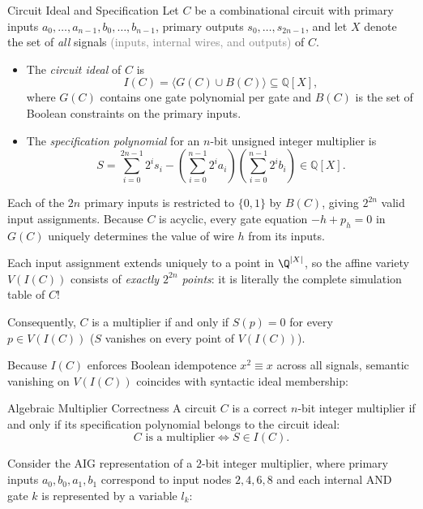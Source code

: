 \documentclass[a4paper, 11pt]{report}
\begin{document}
\begin{defframe}{Circuit Ideal and Specification}{}
Let $C$ be a combinational circuit with primary inputs $a_0,\dots,a_{n-1}, b_0,\dots,b_{n-1}$, primary outputs $s_0,\dots,s_{2n-1}$, and let $X$ denote the set of \emph{all} signals \textcolor{gray}{(inputs, internal wires, and outputs)} of $C$.
\begin{itemize}
    \item The \emph{circuit ideal} of $C$ is
    $$
        I(C) = \langle G(C) \cup B(C) \rangle \subseteq \mathbb{Q}[X],
    $$
    where $G(C)$ contains one gate polynomial per gate and $B(C)$ is the set of Boolean constraints on the primary inputs.
    \item The \emph{specification polynomial} for an $n$-bit unsigned integer multiplier is
    $$
        S = \sum_{i=0}^{2n-1} 2^i s_i - \left(\sum_{i=0}^{n-1} 2^i a_i\right)\left(\sum_{i=0}^{n-1} 2^i b_i\right) \in \mathbb{Q}[X].
    $$
\end{itemize}
\end{defframe}

Each of the $2n$ primary inputs is restricted to $\{0,1\}$ by $B(C)$, giving $2^{2n}$ valid input assignments. Because $C$ is acyclic, every gate equation $-h + p_h = 0$ in $G(C)$ uniquely determines the value of wire $h$ from its inputs. 

Each input assignment extends uniquely to a point in $\Q^{|X|}$, so the affine variety $V(I(C))$ consists of \emph{exactly $2^{2n}$ points}: it is literally the complete simulation table of $C$!

Consequently, $C$ is a multiplier if and only if $S(p) = 0$ for every $p \in V(I(C))$ ($S$ vanishes on every point of $V(I(C))$). 

Because $I(C)$ enforces Boolean idempotence $x^2 \equiv x$ across all signals, semantic vanishing on $V(I(C))$ coincides with syntactic ideal membership:
\begin{thmframe}{Algebraic Multiplier Correctness}{}
A circuit $C$ is a correct $n$-bit integer multiplier if and only if its specification polynomial belongs to the circuit ideal:
$$
    C \text{ is a multiplier} \iff S \in I(C).
$$
\end{thmframe}

Consider the AIG representation of a $2$-bit integer multiplier, where primary inputs $a_0, b_0, a_1, b_1$ correspond to input nodes $2, 4, 6, 8$ and each internal AND gate $k$ is represented by a variable $l_k$:
\end{document}
